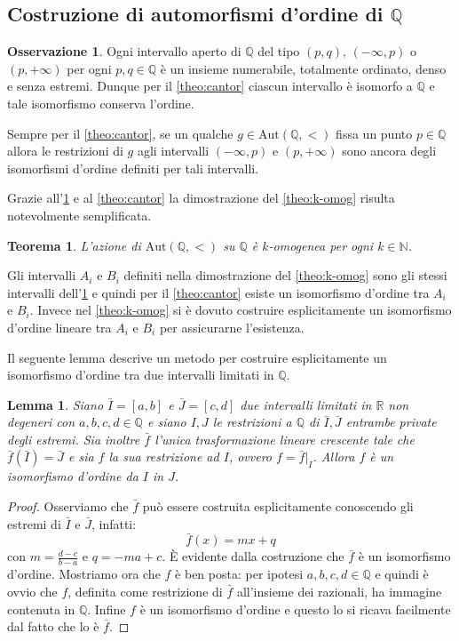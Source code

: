 \documentclass[12pt,a4paper,openright]{report}
\newcommand{\aut}{ \mathrm{Aut} ( \mathbb{Q},< ) } %
\newcommand{\N}{\mathbb{N}} %
\newcommand{\Q}{\mathbb{Q}} %
\newcommand{\R}{\mathbb{R}} %
\newcommand{\0}{\setminus\{0\}} %
\theoremstyle{definition}
\newtheorem{oss}[defn]{Osservazione}
\theoremstyle{plain}
\newtheorem{theo}[defn]{Teorema}
\newtheorem{lem}[defn]{Lemma}
\begin{document}
\subsection{Costruzione di automorfismi d'ordine di $\Q$}

\begin{oss} \label{oss:intervcantor}
    Ogni intervallo aperto di $\Q$ del tipo $\left(p,q \right) \mbox{, } \left(-\infty,p \right)$ o $\left(p,+\infty \right)$ per ogni $p,q \in \Q$ è un insieme numerabile, totalmente ordinato, denso e senza estremi. Dunque per il \cref{theo:cantor} ciascun intervallo è isomorfo a $\Q$ e tale isomorfismo conserva l'ordine.

    \smallskip Sempre per il \cref{theo:cantor}, se un qualche $g \in \aut$ fissa un punto $p \in \Q$ allora le restrizioni di $g$ agli intervalli $\left(-\infty,p \right)$ e $\left( p,+\infty \right)$ sono ancora degli isomorfismi d'ordine definiti per tali intervalli.
\end{oss}

Grazie all'\cref{oss:intervcantor} e al \cref{theo:cantor} la dimostrazione del \cref{theo:k-omog} risulta notevolmente semplificata.

\begin{theo}
    L'azione di $\aut$ su $\Q$ è $k$-omogenea per ogni $k \in \N$.
\end{theo}
    Gli intervalli $A_i$ e $B_i$ definiti nella dimostrazione del \cref{theo:k-omog} sono gli stessi intervalli dell'\cref{oss:intervcantor} e quindi per il \cref{theo:cantor} esiste un isomorfismo d'ordine tra $A_i$ e $B_i$. Invece nel \cref{theo:k-omog} si è dovuto costruire esplicitamente un isomorfismo d'ordine lineare tra $A_i$ e $B_i$ per assicurarne l'esistenza. 

\bigskip Il seguente lemma descrive un metodo per costruire esplicitamente un isomorfismo d'ordine tra due intervalli limitati in $\Q$.

\begin{lem} \label{lem:costruzione_isomorf}
    Siano $\bar{I}=[a,b]$ e $\bar{J}=[c,d]$ due intervalli limitati in $\R$ non degeneri con $a,b,c,d \in \Q$ e siano $I,J$ le restrizioni a $\Q$ di $\bar{I},\bar{J}$ entrambe private degli estremi. Sia inoltre $\bar{f}$ l'unica trasformazione lineare crescente tale che $\bar{f}\left(\bar{I}\right)=\bar{J}$ e sia $f$ la sua restrizione ad $I$, ovvero $f=\bar{f}|_I$. Allora $f$ è un isomorfismo d'ordine da $I$ in $J$.
\end{lem}
\begin{proof}
    Osserviamo che $\bar{f}$ può essere costruita esplicitamente conoscendo gli estremi di $\bar{I}$ e $\bar{J}$, infatti:
    \[\bar{f}(x)=mx+q \]
    con ${m=\frac{d-c}{b-a}}$ e ${q=-ma+c}$.
    È evidente dalla costruzione che $\bar{f}$ è un isomorfismo d'ordine. Mostriamo ora che $f$ è ben posta: per ipotesi $a,b,c,d \in \Q$ e quindi è ovvio che $f$, definita come restrizione di $\bar{f}$ all'insieme dei razionali, ha immagine contenuta in $\Q$. Infine $f$ è un isomorfismo d'ordine e questo lo si ricava facilmente dal fatto che lo è $\bar{f}$.
\end{proof}
\end{document}
